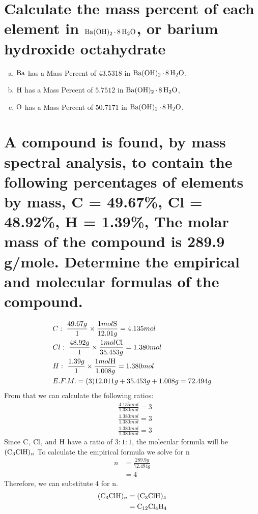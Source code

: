 \documentclass[11pt]{article}
\begin{document}
\section{Calculate the mass percent of each element in \(\ce{Ba(OH)2*8H2O}\), or barium hydroxide octahydrate}
\label{sec:org2ab7ee9}
\begin{enumerate}[(a)]
\item \(\ce{Ba}\)  has a Mass Percent of \(43.5318\) in \(\ce{Ba(OH)2*8H2O}\),
\item \(\ce{H}\)  has a Mass Percent of \(5.7512\) in \(\ce{Ba(OH)2*8H2O}\),
\item \(\ce{O}\)  has a Mass Percent of \(50.7171\) in \(\ce{Ba(OH)2*8H2O}\),
\end{enumerate}

\section{A compound is found, by mass spectral analysis, to contain the following percentages of elements by mass, C = 49.67\%, Cl = 48.92\%, H = 1.39\%, The molar mass of the compound is 289.9 g/mole. Determine the empirical and molecular formulas of the compound.}
\label{sec:orga8a2ebe}
\begin{align*}
&C:\ \frac{49.67g}{1}\times\frac{1mol\ce{S}}{12.01g}=4.135mol\\
&Cl:\ \frac{48.92g}{1}\times\frac{1mol\ce{Cl}}{35.453g}=1.380mol\\
&H:\ \frac{1.39g}{1}\times\frac{1mol\ce{H}}{1.008g}=1.380mol\\
&E.F.M.=(3)12.011g+35.453g+1.008g=72.494g
\end{align*}
From that we can calculate the following ratios:
\begin{align*}
&\frac{4.135mol}{1.380mol}=3\\
&\frac{1.380mol}{1.380mol}=3\\
&\frac{1.380mol}{1.380mol}=3
\end{align*}
Since \(\ce{C}\), \(\ce{Cl}\), and  \(\ce{H}\) have a ratio of \(3:1:1\), the molecular formula will be \(\ce{(C3ClH)_n}\) To calculate the empirical formula we solve for n
\begin{align*}
n&=\frac{289.9g}{72.494g}\\
&=4
\end{align*}
Therefore, we can substitute 4 for n.
\begin{align*}
\ce{(C3ClH)_n}&=\ce{(C3ClH)4}\\
&=\ce{C12Cl4H4}
\end{align*}
\end{document}
